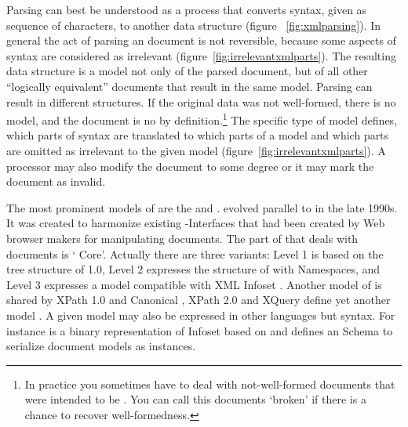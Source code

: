 Parsing  can best be understood as a process that converts 
syntax, given as sequence of characters, to another data structure (figure%
~\ref{fig:xmlparsing}). In general the act of parsing an  document 
is not reversible, because some aspects of  syntax are considered
as irrelevant (figure~\ref{fig:irrelevantxmlparts}). The resulting data 
structure is a model not only of the parsed document, but of all other 
``logically equivalent'' documents that result in the same model. Parsing
 can result in different structures. If the 
original data was not well-formed,
there is no model, and the document is no  by definition.\footnote{%
In practice you sometimes have to deal with not-well-formed documents that were 
intended to be . You can call this documents `broken'  if
there is a chance to recover well-formedness.} The specific type of model
defines, which parts of syntax are translated to which parts of a model and 
which parts are omitted as irrelevant to the given model 
(figure~\ref{fig:irrelevantxmlparts}). A processor may also modify the 
document to some degree or it may mark the document as invalid.

\label{p:xmlmodel}
The most prominent models of  are the 
and .  evolved parallel to  in the late 1990s.
It was created to harmonize existing -Interfaces that had been created
by Web browser makers for manipulating  documents. The part of
 that deals with  documents is ` Core'.
Actually there are three variants: Level 1 is based on the
tree structure of  1.0, Level 2 expresses the structure of 
with Namespaces, and Level 3 expresses a model compatible with XML Infoset
\cite{Cowan2004}. Another model of  is shared by XPath 1.0 and 
Canonical  \cite{Boyer2008}, XPath 2.0 and XQuery define yet 
another model \cite{Berglund2010}. A given model may also be expressed in
other languages but  syntax. For instance  
\cite{FastInfoset2005} is a binary representation of Infoset based on
 and \textcite{Tobin2001} defines an  Schema to serialize
 document models as  instances.

